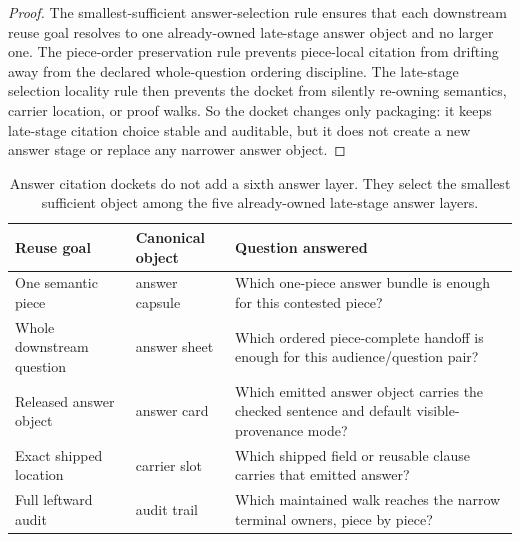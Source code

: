 \documentclass[11pt]{article}
\begin{document}
\begin{proof}
The smallest-sufficient answer-selection rule ensures that each downstream reuse goal resolves to one already-owned late-stage answer object and no larger one.
The piece-order preservation rule prevents piece-local citation from drifting away from the declared whole-question ordering discipline.
The late-stage selection locality rule then prevents the docket from silently re-owning semantics, carrier location, or proof walks.
So the docket changes only packaging: it keeps late-stage citation choice stable and auditable, but it does not create a new answer stage or replace any narrower answer object.\qedhere
\end{proof}

\begin{table}[t]
\centering
\small
\begin{tabularx}{\linewidth}{@{}l l X@{}}
\toprule
Reuse goal & Canonical object & Question answered \\
\midrule
One semantic piece & answer capsule & Which one-piece answer bundle is enough for this contested piece? \\
Whole downstream question & answer sheet & Which ordered piece-complete handoff is enough for this audience/question pair? \\
Released answer object & answer card & Which emitted answer object carries the checked sentence and default visible-provenance mode? \\
Exact shipped location & carrier slot & Which shipped field or reusable clause carries that emitted answer? \\
Full leftward audit & audit trail & Which maintained walk reaches the narrow terminal owners, piece by piece? \\
\bottomrule
\end{tabularx}
\caption{Answer citation dockets do not add a sixth answer layer. They select the smallest sufficient object among the five already-owned late-stage answer layers.}
\label{tab:answercitationdockets}
\end{table}
\end{document}
